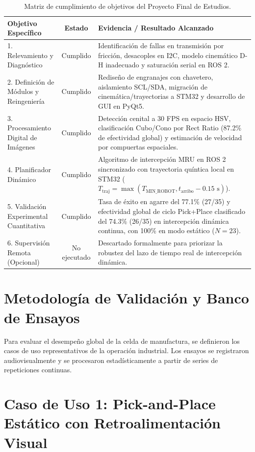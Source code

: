 \documentclass[12pt, a4paper]{report}
\begin{document}
\begin{table}[H]
\centering
\small
\begin{tabularx}{\linewidth}{|p{3.5cm}|c|X|}
\hline
\textbf{Objetivo Específico} & \textbf{Estado} & \textbf{Evidencia / Resultado Alcanzado} \\ \hline
1. Relevamiento y Diagnóstico & Cumplido & Identificación de fallas en transmisión por fricción, desacoples en I2C, modelo cinemático D-H inadecuado y saturación serial en ROS 2. \\ \hline
2. Definición de Módulos y Reingeniería & Cumplido & Rediseño de engranajes con chavetero, aislamiento SCL/SDA, migración de cinemática/trayectorias a STM32 y desarrollo de GUI en PyQt5. \\ \hline
3. Procesamiento Digital de Imágenes & Cumplido & Detección cenital a 30 FPS en espacio HSV, clasificación Cubo/Cono por Rect Ratio (87.2\% de efectividad global) y estimación de velocidad por compuertas espaciales. \\ \hline
4. Planificador Dinámico & Cumplido & Algoritmo de intercepción MRU en ROS 2 sincronizado con trayectoria quíntica local en STM32 ($T_{\text{traj}} = \max(T_{\text{MIN\_ROBOT}}, t_{\text{arribo}} - 0.15\text{ s})$). \\ \hline
5. Validación Experimental Cuantitativa & Cumplido & Tasa de éxito en agarre del 77.1\% (27/35) y efectividad global de ciclo Pick+Place clasificado del 74.3\% (26/35) en intercepción dinámica continua, con 100\% en modo estático ($N=23$). \\ \hline
6. Supervisión Remota (Opcional) & No ejecutado & Descartado formalmente para priorizar la robustez del lazo de tiempo real de intercepción dinámica. \\ \hline
\end{tabularx}
\caption{Matriz de cumplimiento de objetivos del Proyecto Final de Estudios.}
\label{tab:cumplimiento_objetivos}
\end{table}

\section{Metodología de Validación y Banco de Ensayos}
Para evaluar el desempeño global de la celda de manufactura, se definieron los casos de uso representativos de la operación industrial. Los ensayos se registraron audiovisualmente y se procesaron estadísticamente a partir de series de repeticiones continuas.

\section{Caso de Uso 1: Pick-and-Place Estático con Retroalimentación Visual}
\end{document}
